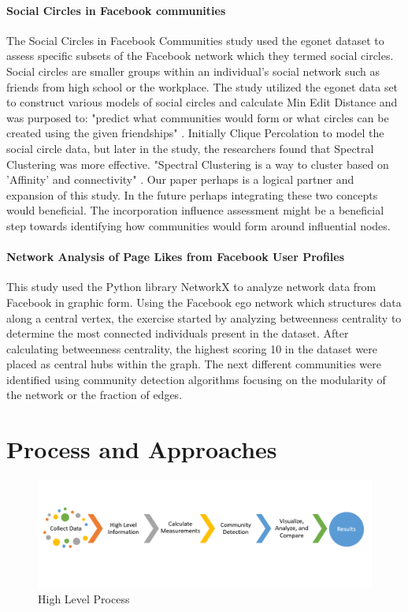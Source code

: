 \documentclass[11pt,twocolumn]{article}
\begin{document}
\paragraph{Social Circles in Facebook communities \cite{social-network-networkx}}   

The Social Circles in Facebook Communities study used the egonet dataset to assess specific subsets of the Facebook network which they termed social circles. Social circles are smaller groups within an individual's social network such as friends from high school or the workplace. The study utilized the egonet data set to construct various models of social circles and calculate Min Edit Distance and was purposed to: "predict what communities would form or what circles can be created using the given friendships" \cite{social-network-networkx}. Initially Clique Percolation to model the social circle data, but later in the study, the researchers found that Spectral Clustering was more effective. "Spectral Clustering is a way to cluster based on 'Affinity' and connectivity" \cite{social-network-networkx}. Our paper perhaps is a logical partner and expansion of this study. In the future perhaps integrating these two concepts would beneficial. The incorporation influence assessment might be a beneficial step towards identifying how communities would form around influential nodes.

\paragraph{Network Analysis of Page Likes from Facebook User Profiles \cite{page-likes-facebook}}

This study used the Python library NetworkX to analyze network data from Facebook in graphic form. Using the Facebook ego network which structures data along a central vertex, the exercise started by analyzing betweenness centrality to determine the most connected individuals present in the dataset. After calculating betweenness centrality, the highest scoring 10 in the dataset were placed as central hubs within the graph. The next different communities were identified using community detection algorithms focusing on the modularity of the network or the fraction of edges. 

\section{Process and Approaches}

\begin{figure}[hbt!]
\includegraphics[scale=0.2]{process_flow.PNG} 
\caption{High Level Process}
\end{figure}
\end{document}
